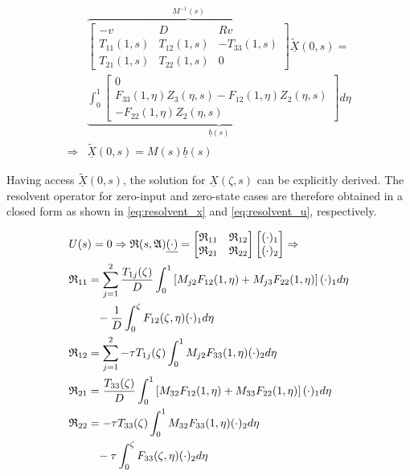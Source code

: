 \begin{equation} \label{eq:BC_AE}
\begin{aligned}
        &\overbrace{\begin{bmatrix}
            -v & D & Rv\\
            T_{11}(1,s) & T_{12}(1,s) & -T_{33}(1,s)\\
            T_{21}(1,s) & T_{22}(1,s) & 0
        \end{bmatrix}}^{M^{-1}(s)} \underline{\tilde{X}}(0,s) =\\ 
        &\underbrace{\int_0^1 \begin{bmatrix}
            0\\ F_{33}(1, \eta) Z_3(\eta,s) - F_{12}(1, \eta) Z_2(\eta,s)\\ -F_{22}(1, \eta) Z_2(\eta,s)
        \end{bmatrix} d\eta}_{\underline{b}(s)} \\
        \Rightarrow &\underline{\tilde{X}}(0,s) = M(s) \underline{b}(s)
\end{aligned}
\end{equation}

Having access $\underline{\tilde{X}}(0,s)$, the solution for $\underline{X}(\zeta,s)$ can be explicitly derived. The resolvent operator for zero-input and zero-state cases are therefore obtained in a closed form as shown in \eqref{eq:resolvent_x} and \eqref{eq:resolvent_u}, respectively.

\begin{equation} \label{eq:resolvent_x}
\begin{aligned}
    &U(s) = 0 \Rightarrow \mathfrak{R}(s, \mathfrak{A}) \underline{(\cdot)} = \begin{bmatrix}
        \mathfrak{R}_{11} & \mathfrak{R}_{12}\\
        \mathfrak{R}_{21} & \mathfrak{R}_{22}
    \end{bmatrix} \begin{bmatrix}
        (\cdot)_1\\ (\cdot)_2
    \end{bmatrix} \Rightarrow\\
    &\mathfrak{R}_{11} = \sum_{j=1}^2 \frac{T_{1j}(\zeta)}{D} \int_0^1 \left[ M_{j2} F_{12}(1,\eta) + M_{j3} F_{22}(1,\eta) \right] (\cdot)_1 d\eta\\
    &\hspace{2.5em} -\frac{1}{D} \int_0^{\zeta} F_{12}(\zeta, \eta) (\cdot)_1 d\eta\\
    &\mathfrak{R}_{12} = \sum_{j=1}^2 -\tau T_{1j}(\zeta) \int_0^1 M_{j2} F_{33}(1,\eta) (\cdot)_2 d\eta\\
    &\mathfrak{R}_{21} = \frac{T_{33}(\zeta)}{D} \int_0^1 \left[ M_{32} F_{12}(1,\eta) + M_{33} F_{22}(1,\eta) \right] (\cdot)_1 d\eta\\
    &\mathfrak{R}_{22} = -\tau T_{33}(\zeta) \int_0^1 M_{32} F_{33}(1,\eta) (\cdot)_2 d\eta\\
    &\hspace{2.5em} -\tau \int_0^{\zeta} F_{33}(\zeta, \eta) (\cdot)_2 d\eta
\end{aligned}
\end{equation}

